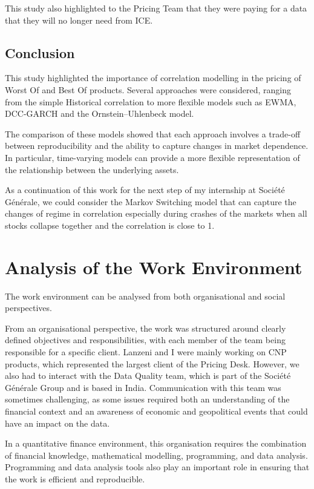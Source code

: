 \documentclass{article}
\begin{document}
This study also highlighted to the Pricing Team that they were paying for a data that they will no longer need from ICE.


\subsection{Conclusion}

This study highlighted the importance of correlation modelling in the pricing of Worst Of and Best Of products. Several approaches were considered, ranging from the simple Historical correlation to more flexible models such as EWMA, DCC-GARCH and the Ornstein–Uhlenbeck model.

The comparison of these models showed that each approach involves a trade-off between reproducibility and the ability to capture changes in market dependence. In particular, time-varying models can provide a more flexible representation of the relationship between the underlying assets.

As a continuation of this work for the next step of my internship at Société Générale, we could consider the Markov Switching model that can capture the changes of regime in correlation especially during crashes of the markets when all stocks collapse together and the correlation is close to 1.


\clearpage

\section{Analysis of the Work Environment}

The work environment can be analysed from both organisational and social perspectives.

From an organisational perspective, the work was structured around clearly defined objectives and responsibilities, with each member of the team being responsible for a specific client. Lanzeni and I were mainly working on CNP products, which represented the largest client of the Pricing Desk. However, we also had to interact with the Data Quality team, which is part of the Société Générale Group and is based in India. Communication with this team was sometimes challenging, as some issues required both an understanding of the financial context and an awareness of economic and geopolitical events that could have an impact on the data.

In a quantitative finance environment, this organisation requires the combination of financial knowledge, mathematical modelling, programming, and data analysis. Programming and data analysis tools also play an important role in ensuring that the work is efficient and reproducible.
\end{document}
